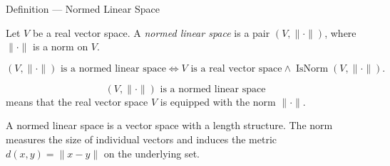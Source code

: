\begin{definitionbox}{Definition --- Normed Linear Space}
\begin{definition}\label{def:normed-linear-space}
Let \(V\) be a real vector space.  A \emph{normed linear space} is a pair
\((V,\|\cdot\|)\), where \(\|\cdot\|\) is a norm on \(V\).
\end{definition}
\end{definitionbox}

\begin{remark*}
\[
\text{\((V,\|\cdot\|)\) is a normed linear space}
\Longleftrightarrow
V\text{ is a real vector space}
\land
\operatorname{IsNorm}(V,\|\cdot\|).
\]
\end{remark*}

\begin{remark*}
\[
\text{\((V,\|\cdot\|)\) is a normed linear space}
\]
means that the real vector space \(V\) is equipped with the norm
\(\|\cdot\|\).
\end{remark*}

\begin{remark*}[Interpretation]
A normed linear space is a vector space with a length structure.  The norm
measures the size of individual vectors and induces the metric
\(d(x,y)=\|x-y\|\) on the underlying set.
\end{remark*}

\DefinitionalRoot
